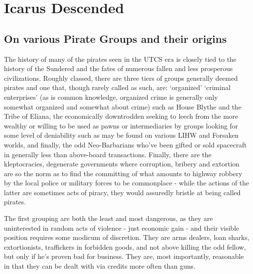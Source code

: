 \section{Icarus Descended}
\subsection{On various Pirate Groups and their origins }

The history of many of the pirates seen in the UTCS era is closely
tied to the history of the Sundered and the fates of numerous fallen
and less prosperous civilizations. Roughly classed, there are three
tiers of groups generally deemed pirates and one that, though rarely
called as such, are: `organized' `criminal enterprises' (as is common
knowledge, organized crime is generally only somewhat organized and
somewhat about crime) such as House Blythe and the Tribe of Eliana,
the economically downtrodden seeking to leech from the more wealthy or
willing to be used as pawns or intermediaries by groups looking for
some level of deniability such as may be found on various LIHW and
Forsaken worlds, and finally, the odd Neo-Barbarians who've been
gifted or sold spacecraft in generally less than above-board
transactions.  Finally, there are the kleptocracies, degenerate
governments where corruption, bribery and extortion are so the norm as
to find the committing of what amounts to highway robbery by the local
police or military forces to be commonplace - while the actions of the
latter are sometimes acts of piracy, they would assuredly bristle at
being called pirates.

The first grouping are both the least and most dangerous, as they are
uninterested in random acts of violence - just economic gain - and
their visible position requires some modicum of discretion. They are
arms dealers, loan sharks, extortionists, traffickers in forbidden
goods, and not above killing the odd fellow, but only if he's proven
bad for business.  They are, most importantly, reasonable in that they
can be dealt with via credits more often than guns.

